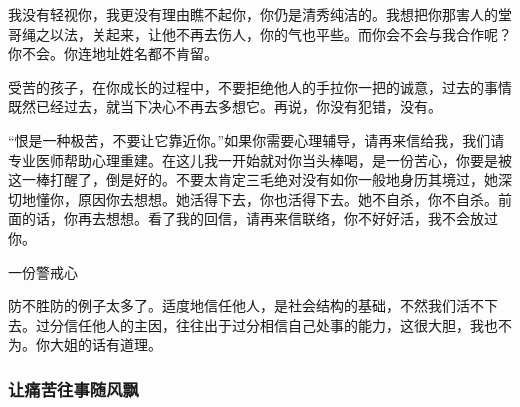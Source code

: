 \par 我没有轻视你，我更没有理由瞧不起你，你仍是清秀纯洁的。我想把你那害人的堂哥绳之以法，关起来，让他不再去伤人，你的气也平些。而你会不会与我合作呢？你不会。你连地址姓名都不肯留。
\par 受苦的孩子，在你成长的过程中，不要拒绝他人的手拉你一把的诚意，过去的事情既然已经过去，就当下决心不再去多想它。再说，你没有犯错，没有。
\par “恨是一种极苦，不要让它靠近你。”如果你需要心理辅导，请再来信给我，我们请专业医师帮助心理重建。在这儿我一开始就对你当头棒喝，是一份苦心，你要是被这一棒打醒了，倒是好的。不要太肯定三毛绝对没有如你一般地身历其境过，她深切地懂你，原因你去想想。她活得下去，你也活得下去。她不自杀，你不自杀。前面的话，你再去想想。看了我的回信，请再来信联络，你不好好活，我不会放过你。
\par {}

\begin{center}
    \par 一份警戒心
\end{center}
\par {}
\par 防不胜防的例子太多了。适度地信任他人，是社会结构的基础，不然我们活不下去。过分信任他人的主因，往往出于过分相信自己处事的能力，这很大胆，我也不为。你大姐的话有道理。
\par {}




\subsubsection{让痛苦往事随风飘}

